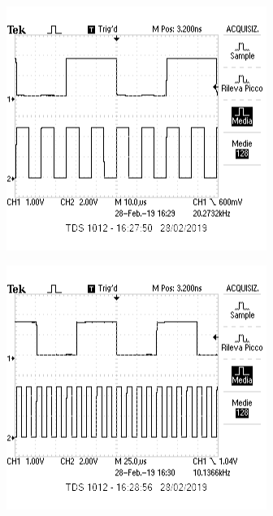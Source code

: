 \documentclass{article}
\begin{document}
	\begin{minipage}{.5\linewidth}
		\centering
		\includegraphics[width=\linewidth]{immagini/f1_4}
		\label{fig:f1_4}
	\end{minipage}\newline
	\begin{minipage}{.5\linewidth}
		\centering
		\includegraphics[width=\linewidth]{immagini/f1_8}
		\label{fig:f1_8}
	\end{minipage}
\end{document}
